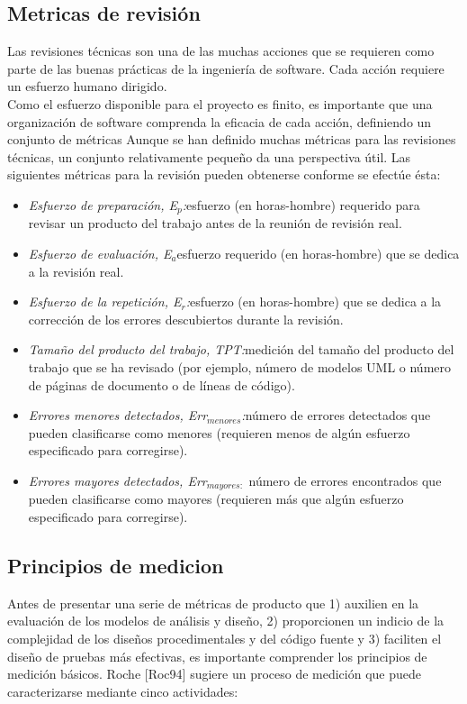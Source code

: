 \subsection{Metricas de revisión}
Las revisiones técnicas son una de las muchas acciones que se requieren como parte de las buenas prácticas de la ingeniería de software. Cada acción requiere un esfuerzo humano dirigido.\\
Como el esfuerzo disponible para el proyecto es finito, es importante que una organización de software comprenda la eficacia de cada acción, definiendo un conjunto de métricas Aunque se han definido muchas métricas para las revisiones técnicas, un conjunto relativamente pequeño da una perspectiva útil. Las siguientes métricas para la revisión pueden obtenerse conforme se efectúe ésta:\\
\begin{itemize}
    \item \textit{Esfuerzo de preparación, E$_p$:}esfuerzo (en horas-hombre) requerido para revisar un producto del trabajo antes de la reunión de revisión real.
    \item \textit{Esfuerzo de evaluación, E$_a$}esfuerzo requerido (en horas-hombre) que se dedica a la revisión real.
    \item \textit{Esfuerzo de la repetición, E$_r$:}esfuerzo (en horas-hombre) que se dedica a la corrección de los errores descubiertos durante la revisión.
    \item \textit{Tamaño del producto del trabajo, TPT:}medición del tamaño del producto del trabajo que se ha revisado (por ejemplo, número de modelos UML o número de páginas de documento o de líneas de código).
    \item \textit{Errores menores detectados, Err$_{menores}$:}número de errores detectados que pueden clasificarse como menores (requieren menos de algún esfuerzo especificado para corregirse).    
    \item \textit{Errores mayores detectados, Err$_{mayores:}$} número de errores encontrados que pueden clasificarse como mayores (requieren más que algún esfuerzo especificado para corregirse).  
\end{itemize}

\subsection{Principios de medicion}
Antes de presentar una serie de métricas de producto que 1) auxilien en la evaluación de los modelos de análisis y diseño, 2) proporcionen un indicio de la complejidad de los diseños procedimentales y del código fuente y 3) faciliten el diseño de pruebas más efectivas, es importante comprender los principios de medición básicos. Roche [Roc94] sugiere un proceso de medición que puede caracterizarse mediante cinco actividades:\\

